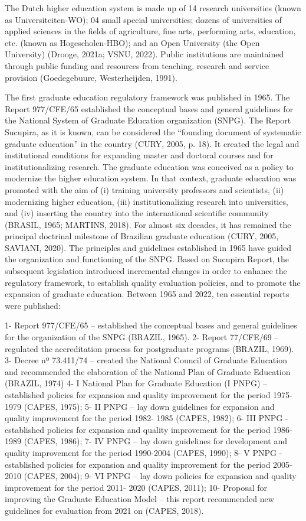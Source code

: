 The Dutch higher education system is made up of 14 research universities (known as Universiteiten-WO); 04 small special universities; dozens of universities of applied sciences in the fields of agriculture, fine arts, performing arts, education, etc. (known as Hogescholen-HBO); and an Open University (the Open University) (Drooge, 2021a; VSNU, 2022). Public institutions are maintained through public funding and resources from teaching, research and service provision (Goedegebuure, Westerheijden, 1991). 
 


The first graduate education regulatory framework was published in 1965. The Report 977/CFE/65 established the conceptual bases and general guidelines for the National System of Graduate Education organization (SNPG). The Report Sucupira, as it is known, can be considered the “founding document of systematic graduate education” in the country (CURY, 2005, p. 18). It created the legal and institutional conditions for expanding master and doctoral courses and for institutionalizing research. The graduate education was conceived as a policy to modernize the higher education system. In that context, graduate education was promoted with the aim of (i) training university professors and scientists, (ii) modernizing higher education, (iii) institutionalizing research into universities, and (iv) inserting the country into the international scientific community (BRASIL, 1965; MARTINS, 2018). For almost six decades, it has remained the principal doctrinal milestone of Brazilian graduate education (CURY, 2005, SAVIANI, 2020). The principles and guidelines established in 1965 have guided the organization and functioning of the SNPG. Based on Sucupira Report, the subsequent legislation introduced incremental changes in order to enhance the regulatory framework, to establish quality evaluation policies, and to promote the expansion of graduate education. Between 1965 and 2022, ten essential reports were published: 
 
1- Report 977/CFE/65 – established the conceptual bases and general guidelines for the organization of the SNPG (BRAZIL, 1965). 
2-	Report 77/CFE/69 – regulated the accreditation process for postgraduate programs (BRAZIL, 1969). 
3-	Decree nº 73.411/74 – created the National Council of Graduate Education and recommended the elaboration of the National Plan of Graduate Education (BRAZIL, 1974) 
4-	I National Plan for Graduate Education (I PNPG) – established policies for expansion and quality improvement for the period 1975-1979 (CAPES, 1975); 
5-	II PNPG – lay down guidelines for expansion and quality improvement for the period 1982-
1985 (CAPES, 1982); 
6-	III PNPG - established policies for expansion and quality improvement for the period 1986-
1989 (CAPES, 1986); 
7-	IV PNPG – lay down guidelines for development and quality improvement for the period 1990-2004 (CAPES, 1990); 
8-	V PNPG - established policies for expansion and quality improvement for the period 2005-
2010 (CAPES, 2004); 
9-	VI PNPG – lay down policies for expansion and quality improvement for the period 2011-
2020 (CAPES, 2011); 
10-	Proposal for improving the Graduate Education Model – this report recommended new guidelines for evaluation from 2021 on (CAPES, 2018). 

